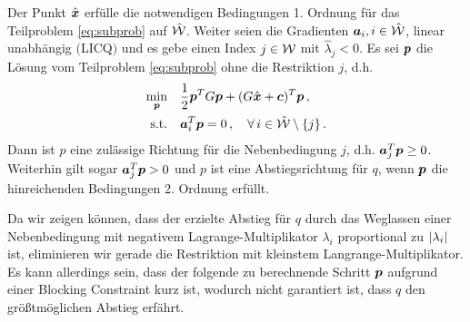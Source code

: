 \begin{theorem}
Der Punkt $\hat{\boldsymbol x}$ erfülle die notwendigen Bedingungen 1. Ordnung für das Teilproblem \textnormal{\eqref{eq:subprob}} auf $\hat{\mathcal W}$. Weiter seien die Gradienten $\boldsymbol a_i, i \in \hat{\mathcal W}$, linear unabhängig $($LICQ$)$ und es gebe einen Index $j \in \mathcal W$ mit $\hat \lambda_j<0$. Es sei $\boldsymbol p$ die Lösung vom Teilproblem \textnormal{\eqref{eq:subprob}} ohne die Restriktion $j$, d.h.
\begin{align*}
	\min_{\boldsymbol p} & \quad \frac 1 2\boldsymbol p^T G\boldsymbol p + (G\hat{ \boldsymbol x} +\boldsymbol c)^T\boldsymbol p \, , \\
	\textnormal{s.t.} & \quad\boldsymbol a_i^T\boldsymbol p = 0 \, , \quad  \forall \, i \in \hat{\mathcal W} \setminus \{j\} \, .
\end{align*}
Dann ist $p$ eine zulässige Richtung für die Nebenbedingung $j$, d.h. $\boldsymbol a_j^T \boldsymbol p \ge 0$. Weiterhin gilt sogar $\boldsymbol a_j^T\boldsymbol p > 0$ und $p$ ist eine Abstiegsrichtung für $q$, wenn $\boldsymbol p$ die hinreichenden Bedingungen 2. Ordnung erfüllt.
\end{theorem}

Da wir zeigen können, dass der erzielte Abstieg für $q$ durch das Weglassen einer Nebenbedingung mit negativem Lagrange-Multiplikator $\lambda_i$ proportional zu $\lvert \lambda_i\rvert$ ist, eliminieren wir gerade die Restriktion mit kleinstem Langrange-Multiplikator. Es kann allerdings sein, dass der folgende zu berechnende Schritt $\boldsymbol p$ aufgrund einer {Blocking Constraint} kurz ist, wodurch nicht garantiert ist, dass $q$ den größtmöglichen Abstieg erfährt.

%


